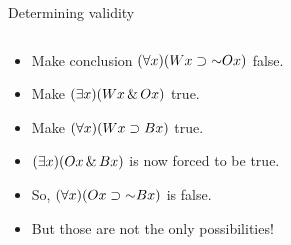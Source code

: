 \begin{frame}{Determining validity}

  \begin{columns}
    \begin{column}{.5\textwidth}
      \begin{itemize}[<+->]
        \item Make conclusion $\qt{\forall}{x}(W\qv{x} \to \lnot O\qv{x})$ false.
        \item Make $(\exists x)(Wx \,\&\, Ox)$ true.
        \item Make $(\forall x)(Wx \supset Bx)$ true.
        \item $(\exists x)(Ox \,\&\, Bx)$ is now forced to be true.
        \item So, $\qt{\forall}{x}(O\qv{x} \to \lnot B\qv{x})$ is false.
        \item But those are not the only possibilities!
      \end{itemize}
    \end{column}
    \begin{column}{.5\textwidth}
\end{column}
\end{columns}
\end{frame}

